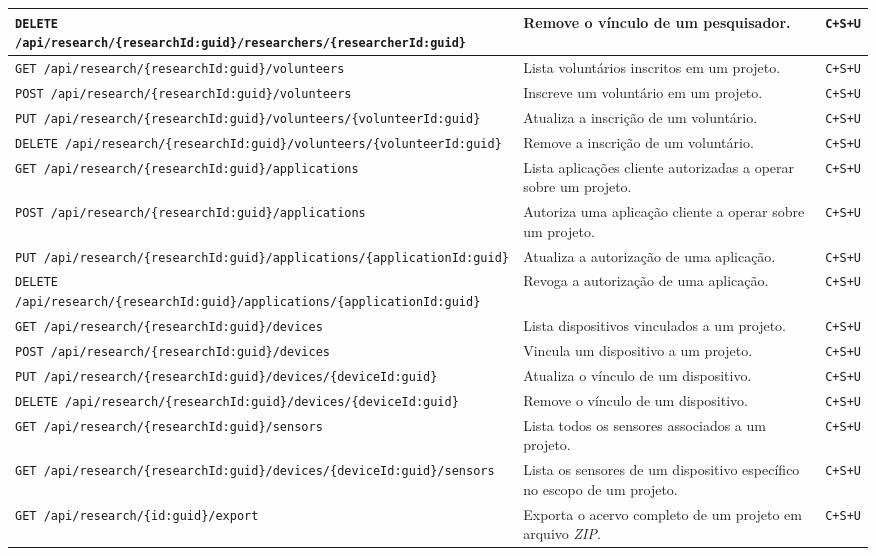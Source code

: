 \begin{longtable}{|p{}|p{}|p{}|}
\texttt{DELETE /api/research/\{researchId:guid\}/researchers/\{researcherId:guid\}} & Remove o vínculo de um pesquisador. & \texttt{C+S+U} \\ \hline
\texttt{GET /api/research/\{researchId:guid\}/volunteers} & Lista voluntários inscritos em um projeto. & \texttt{C+S+U} \\ \hline
\texttt{POST /api/research/\{researchId:guid\}/volunteers} & Inscreve um voluntário em um projeto. & \texttt{C+S+U} \\ \hline
\texttt{PUT /api/research/\{researchId:guid\}/volunteers/\{volunteerId:guid\}} & Atualiza a inscrição de um voluntário. & \texttt{C+S+U} \\ \hline
\texttt{DELETE /api/research/\{researchId:guid\}/volunteers/\{volunteerId:guid\}} & Remove a inscrição de um voluntário. & \texttt{C+S+U} \\ \hline
\texttt{GET /api/research/\{researchId:guid\}/applications} & Lista aplicações cliente autorizadas a operar sobre um projeto. & \texttt{C+S+U} \\ \hline
\texttt{POST /api/research/\{researchId:guid\}/applications} & Autoriza uma aplicação cliente a operar sobre um projeto. & \texttt{C+S+U} \\ \hline
\texttt{PUT /api/research/\{researchId:guid\}/applications/\{applicationId:guid\}} & Atualiza a autorização de uma aplicação. & \texttt{C+S+U} \\ \hline
\texttt{DELETE /api/research/\{researchId:guid\}/applications/\{applicationId:guid\}} & Revoga a autorização de uma aplicação. & \texttt{C+S+U} \\ \hline
\texttt{GET /api/research/\{researchId:guid\}/devices} & Lista dispositivos vinculados a um projeto. & \texttt{C+S+U} \\ \hline
\texttt{POST /api/research/\{researchId:guid\}/devices} & Vincula um dispositivo a um projeto. & \texttt{C+S+U} \\ \hline
\texttt{PUT /api/research/\{researchId:guid\}/devices/\{deviceId:guid\}} & Atualiza o vínculo de um dispositivo. & \texttt{C+S+U} \\ \hline
\texttt{DELETE /api/research/\{researchId:guid\}/devices/\{deviceId:guid\}} & Remove o vínculo de um dispositivo. & \texttt{C+S+U} \\ \hline
\texttt{GET /api/research/\{researchId:guid\}/sensors} & Lista todos os sensores associados a um projeto. & \texttt{C+S+U} \\ \hline
\texttt{GET /api/research/\{researchId:guid\}/devices/\{deviceId:guid\}/sensors} & Lista os sensores de um dispositivo específico no escopo de um projeto. & \texttt{C+S+U} \\ \hline
\texttt{GET /api/research/\{id:guid\}/export} & Exporta o acervo completo de um projeto em arquivo \textit{ZIP}. & \texttt{C+S+U} \\ \hline
\end{longtable}

